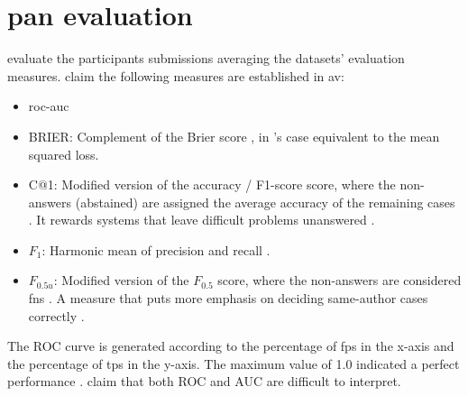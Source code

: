 \section{\acs{pan} evaluation}
\label{sec:pan_evaluation}

\citet{ayele_overview_2024,bevendorff_overview_2024} evaluate the participants submissions averaging the datasets' evaluation measures.
\citet{ayele_overview_2024} claim the following measures are established in \ac{av}:
\begin{itemize}
    \item \ac{roc-auc} \cite{bevendorff_overview_2024,weerasinghe_feature_vector_difference_2021,kocher_unine_2015}
    \item BRIER: Complement of the Brier score \cite{bevendorff_overview_2024,weerasinghe_feature_vector_difference_2021}, in \citet{bevendorff_overview_2024}'s case equivalent to the mean squared loss.
    \item C@1: Modified version of the accuracy \cite{bevendorff_overview_2024}/ F1-score \cite{weerasinghe_feature_vector_difference_2021} score, 
    where the non-answers (abstained) are assigned the average accuracy of the remaining cases \cite{bevendorff_overview_2024}. 
    It rewards systems that leave difficult problems unanswered \cite{weerasinghe_feature_vector_difference_2021}.
    \item $F_1$: Harmonic mean of precision and recall \cite{bevendorff_overview_2024,weerasinghe_feature_vector_difference_2021}.
    \item $F_{0.5u}$: Modified version of the $F_{0.5}$ score, where the non-answers are considered \acp{fn} \cite{bevendorff_overview_2024}. A measure that puts more emphasis on deciding same-author cases correctly \cite{weerasinghe_feature_vector_difference_2021}.
\end{itemize}

The ROC curve is generated according to the percentage of \acp{fp} in the x-axis and the percentage of \acp{tp} in the y-axis.
The maximum value of 1.0 indicated a perfect performance \cite{kocher_unine_2015}.
\citet{kocher_unine_2015} claim that both ROC and AUC are difficult to interpret.